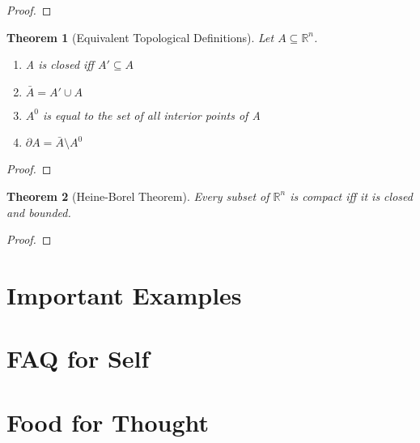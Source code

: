 \documentclass[11pt, oneside]{book}
\theoremstyle{break}
\newtheorem{thm}{Theorem}[section]
\newtheorem*{proof}{Proof}
\newcommand{\bb}[1]{\mathbb{#1}}			%
\begin{document}
\begin{proof}
	
\end{proof}

\begin{thm}[Equivalent Topological Definitions]
	Let $A \subseteq \bb{R}^n$.
	\begin{enumerate}
		\item A is closed iff $A' \subseteq A$
		\item $\bar{A} = A' \cup A$
		\item $A^0$ is equal to the set of all interior points of A
		\item $\partial A = \bar{A} \setminus A^0$
	\end{enumerate}
\end{thm}

\begin{proof}
	
\end{proof}

\begin{thm}[Heine-Borel Theorem]
	Every subset of $\bb{R}^n$ is compact iff it is closed and bounded.
\end{thm}

\begin{proof}
	
\end{proof}

\chapter{Important Examples}


\chapter{FAQ for Self}


\chapter{Food for Thought}
\end{document}
